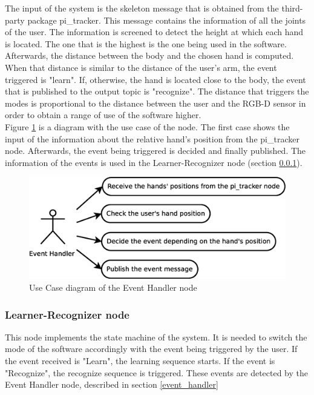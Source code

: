 	The input of the system is the skeleton message that is obtained from the third-party package pi\_tracker. This message contains the information of all the joints of the user. The information is screened to detect the height at which each hand is located. The one that is the highest is the one being used in the software. Afterwards, the distance between the body and the chosen hand is computed. When that distance is similar to the distance of the user's arm, the event triggered is "learn". If, otherwise, the hand is located close to the body, the event that is published to the output topic is "recognize". 
	The distance that triggers the modes is proportional to the distance between the user and the RGB-D sensor in order to obtain a range of use of the software higher. 
	\\
\newpage
	Figure \ref{uc_event} is a diagram with the use case of the node. 
	The first case shows the input of the information about the relative hand's position from the pi\_tracker node. 
	Afterwards, the event being triggered is decided and finally published. 
	The information of the events is used in the Learner-Recognizer node (section \ref{learner_recognizer}).
	\vspace{0.5cm}
	\begin{figure}[H]
		\centering
			\includegraphics[scale=0.4]{img/diagrams/uc_event_handler.eps}
			\caption[Use case diagram Event Handler node]{Use Case diagram of the Event Handler node}
		\label{uc_event}
	\end{figure}
\vspace{0.5cm}



\subsubsection{Learner-Recognizer node}
\label{learner_recognizer}
	This node implements the state machine of the system. 
	It is needed to switch the mode of the software accordingly with the event being triggered by the user.  
	If the event received is "Learn", the learning sequence starts. If the event is "Recognize", the recognize sequence is triggered. 
	These events are detected by the Event Handler node, described in section \ref{event_handler}
	\\
\vspace{0.5cm}


